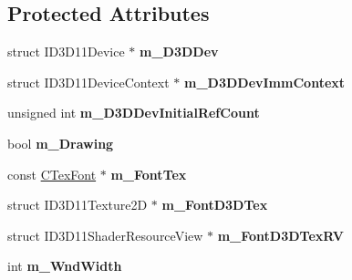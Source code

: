 \subsection*{Protected Attributes}
\begin{DoxyCompactItemize}
\item 
\hypertarget{class_c_tw_graph_direct3_d11_aabc63b766a61dff65211b633a2acdd32}{struct I\+D3\+D11\+Device $\ast$ {\bfseries m\+\_\+\+D3\+D\+Dev}}\label{class_c_tw_graph_direct3_d11_aabc63b766a61dff65211b633a2acdd32}

\item 
\hypertarget{class_c_tw_graph_direct3_d11_a8c0685094d0b0a1416437270a613274e}{struct I\+D3\+D11\+Device\+Context $\ast$ {\bfseries m\+\_\+\+D3\+D\+Dev\+Imm\+Context}}\label{class_c_tw_graph_direct3_d11_a8c0685094d0b0a1416437270a613274e}

\item 
\hypertarget{class_c_tw_graph_direct3_d11_ab9c95808cc81154bd17e216e4b1c204b}{unsigned int {\bfseries m\+\_\+\+D3\+D\+Dev\+Initial\+Ref\+Count}}\label{class_c_tw_graph_direct3_d11_ab9c95808cc81154bd17e216e4b1c204b}

\item 
\hypertarget{class_c_tw_graph_direct3_d11_a0b823d2c527665b43cc16553ff185538}{bool {\bfseries m\+\_\+\+Drawing}}\label{class_c_tw_graph_direct3_d11_a0b823d2c527665b43cc16553ff185538}

\item 
\hypertarget{class_c_tw_graph_direct3_d11_a61fc414e03ee70b757b8680b8b7a2baf}{const \hyperlink{struct_c_tex_font}{C\+Tex\+Font} $\ast$ {\bfseries m\+\_\+\+Font\+Tex}}\label{class_c_tw_graph_direct3_d11_a61fc414e03ee70b757b8680b8b7a2baf}

\item 
\hypertarget{class_c_tw_graph_direct3_d11_a91638a95c3eb1d7e5a9b2b23eda8765f}{struct I\+D3\+D11\+Texture2\+D $\ast$ {\bfseries m\+\_\+\+Font\+D3\+D\+Tex}}\label{class_c_tw_graph_direct3_d11_a91638a95c3eb1d7e5a9b2b23eda8765f}

\item 
\hypertarget{class_c_tw_graph_direct3_d11_af101e959731ca86696d5f7a77b691628}{struct I\+D3\+D11\+Shader\+Resource\+View $\ast$ {\bfseries m\+\_\+\+Font\+D3\+D\+Tex\+R\+V}}\label{class_c_tw_graph_direct3_d11_af101e959731ca86696d5f7a77b691628}

\item 
\hypertarget{class_c_tw_graph_direct3_d11_a588f0600a6ab97482620045c112fc34a}{int {\bfseries m\+\_\+\+Wnd\+Width}}\label{class_c_tw_graph_direct3_d11_a588f0600a6ab97482620045c112fc34a}


\end{DoxyCompactItemize}
